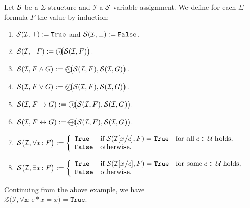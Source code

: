 \begin{Definition}
    Let $\mathcal{S}$ be a $\Sigma$-structure and $\mathcal{I}$ a $\mathcal{S}$-variable assignment.  
    We define for each $\Sigma$-formula $F$ the value 
    by induction:
    \begin{enumerate}
    \item $\mathcal{S}(\mathcal{I},\top) := \mathtt{True}$ and $\mathcal{S}(\mathcal{I},\bot) := \mathtt{False}$.
    \item $\struct(\mathcal{I}, \neg F) := \circneg\bigl(\struct(\mathcal{I}, F)\bigr)$.
    \item $\struct(\mathcal{I}, F \wedge G) := \circwedge\bigl(\struct(\mathcal{I}, F), \struct(\mathcal{I}, G)\bigr)$.
    \item $\struct(\mathcal{I}, F \vee G) := \circvee\bigl(\struct(\mathcal{I}, F), \struct(\mathcal{I}, G)\bigr)$.
    \item $\struct(\mathcal{I}, F \rightarrow G) := \circright\bigl(\struct(\mathcal{I}, F), \struct(\mathcal{I}, G)\bigr)$.
    \item $\struct(\mathcal{I}, F \leftrightarrow G) := \circleftright\bigl(\struct(\mathcal{I}, F), \struct(\mathcal{I}, G)\bigr)$.
    \item $\mathcal{S}\bigl(\mathcal{I}, \forall x\colon F\bigr) := \left\{
      \begin{array}{ll}
         \mathtt{True}  & \mbox{if}\; \mathcal{S}(\mathcal{I}[x/c], F) = \mathtt{True}\quad \mbox{for all}\; c\in \mathcal{U}\;\mbox{holds}; \\
         \mathtt{False} & \mbox{otherwise}.
      \end{array}
      \right.$
    \item $\mathcal{S}\bigl(\mathcal{I}, \exists x \colon F\bigr) := \left\{
      \begin{array}{ll}
         \mathtt{True}  & \mbox{if}\; \mathcal{S}(\mathcal{I}[x/c], F) = \mathtt{True}\quad \mbox{for some}\; c\in \mathcal{U}\;\mbox{holds}; \\
         \mathtt{False} & \mbox{otherwise}.
      \end{array}
      \right.$\eox    
    \end{enumerate}
\end{Definition}

\exampleEng
Continuing from the above example, we have \\[0.2cm]
\hspace*{1.3cm}  $\mathcal{Z}\bigl(\mathcal{I}, \forall \mathtt{x}: \mathrm{e} * x = x \bigr) = \mathtt{True}$.
\eox

